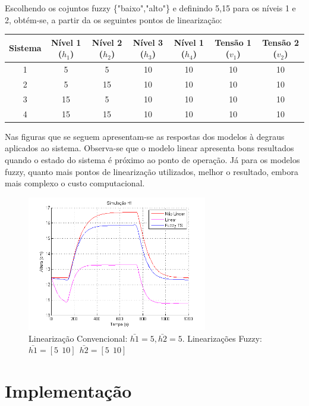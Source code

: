 Escolhendo os cojuntos fuzzy \{"baixo","alto"\} e definindo {5,15} para os níveis 1 e 2, obtém-se, a partir da os seguintes pontos de linearização:

\begin{center}
	\begin{tabular}{|c|c|c|c|c|c|c|}
		\hline
		Sistema & Nível 1 ($h_1$) & Nível 2 ($h_2$) & Nível 3 ($h_3$) & Nível 1 ($h_4$) & Tensão 1 ($v_1$) & Tensão 2 ($v_2$) \\ \hline
		1 & 5 & 5 & 10 & 10 & 10 & 10 \\ \hline
		2 & 5 & 15 & 10 & 10 & 10 & 10 \\ \hline
		3 & 15 & 5 & 10 & 10 & 10 & 10 \\ \hline
		4 & 15 & 15 & 10 & 10 & 10 & 10 \\	\hline
	\end{tabular}
\end{center}

Nas figuras que se seguem apresentam-se as respostas dos modelos à degraus aplicados ao sistema.  Observa-se que o modelo linear apresenta bons resultados quando o estado do sistema é próximo ao ponto de operação. Já para os modelos fuzzy, quanto mais pontos de linearização utilizados, melhor o resultado, embora mais complexo o custo computacional.

\begin{figure}[H]
	\centering
	\includegraphics[width=0.7\textwidth]{img/h1Fuz5_10.png}
	\caption{\small Linearização Convencional: $ \bar{h1}=5, \bar{h2}=5$. Linearizações Fuzzy: $\bar{h1}=[5 \ \ 10] \ \ \bar{h2}=[5 \ \ 10]$ }
	\label{figH1FNM_1}
\end{figure}


\section{Implementação}

%

